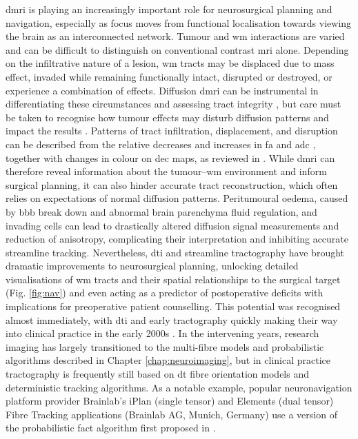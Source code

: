 \documentclass[12pt,phd,a4paper,twoside]{ucl_thesis}
\renewcommand{\textcite}[2][]{
\ifthenelse { \equal {#1} {} }  {\citeauthor{#2}\autocite{#2}}   {\citeauthor{#1}\autocite{#2}}}
\providecommand{\DIFaddtex}[1]{{\protect\color{blue} \sf #1}} %
\providecommand{\DIFdeltex}[1]{{\protect\color{red} \scriptsize #1}} %
\providecommand{\DIFaddbegin}{} %
\providecommand{\DIFaddend}{} %
\providecommand{\DIFdelbegin}{} %
\providecommand{\DIFdelend}{} %
\providecommand{\DIFadd}[1]{\texorpdfstring{\DIFaddtex{#1}}{#1}} %
\providecommand{\DIFdel}[1]{\texorpdfstring{\DIFdeltex{#1}}{}} %
\newcommand{\DIFscaledelfig}{0.5}
\newlength{\DIFdelgraphicswidth} %
\newlength{\DIFdelgraphicsheight} %
\newcommand{\DIFaddincludegraphics}[2][]{{\color{blue}\fbox{\DIFOincludegraphics[#1]{#2}}}} %
\newcommand{\DIFdelincludegraphics}[2][]{%
\sbox{\DIFdelgraphicsbox}{\DIFOincludegraphics[#1]{#2}}%
\settoboxwidth{\DIFdelgraphicswidth}{\DIFdelgraphicsbox} %
\settoboxtotalheight{\DIFdelgraphicsheight}{\DIFdelgraphicsbox} %
\scalebox{\DIFscaledelfig}{%
\parbox[b]{\DIFdelgraphicswidth}{\usebox{\DIFdelgraphicsbox}\\[-\baselineskip] \rule{\DIFdelgraphicswidth}{0em}}\llap{\resizebox{\DIFdelgraphicswidth}{\DIFdelgraphicsheight}{%
\setlength{\unitlength}{\DIFdelgraphicswidth}%
\begin{picture}(1,1)%
\thicklines\linethickness{2pt} %
{\color[rgb]{1,0,0}\put(0,0){\framebox(1,1){}}}%
{\color[rgb]{1,0,0}\put(0,0){\line( 1,1){1}}}%
{\color[rgb]{1,0,0}\put(0,1){\line(1,-1){1}}}%
\end{picture}%
}\hspace*{3pt}}} %
} %
\DeclareRobustCommand{\DIFaddbegin}{\DIFOaddbegin \let\includegraphics\DIFaddincludegraphics} %
\DeclareRobustCommand{\DIFaddend}{\DIFOaddend \let\includegraphics\DIFOincludegraphics} %
\DeclareRobustCommand{\DIFdelbegin}{\DIFOdelbegin \let\includegraphics\DIFdelincludegraphics} %
\DeclareRobustCommand{\DIFdelend}{\DIFOaddend \let\includegraphics\DIFOincludegraphics} %
\begin{document}
\Gls{dmri} is playing an increasingly important role for neurosurgical planning and navigation\autocite{Manan2022}, especially as focus moves from functional localisation towards viewing the brain as an interconnected network.
Tumour and \gls{wm} interactions are varied and can be difficult to distinguish on conventional contrast \gls{mri} alone.
Depending on the infiltrative nature of a lesion, \gls{wm} tracts may be displaced due to mass effect, invaded while remaining functionally intact, disrupted or destroyed, or experience a combination of effects\autocite{Essayed2017,DSouza2019,Manan2023}.
Diffusion \gls{dmri} can be instrumental in differentiating these circumstances and assessing tract integrity\autocite{Field2004,Manan2023}\DIFdelbegin \DIFdel{, but care must be taken to recognise how tumour effects may disturb diffusion patterns and impact the results}\DIFdelend \DIFaddbegin \DIFadd{.
Patterns of tract infiltration, displacement, and disruption can be described from the relative decreases and increases in }\gls{fa} \DIFadd{and }\gls{adc}\DIFadd{, together with changes in colour on }\gls{dec} \DIFadd{maps, as reviewed in \textcite{Manan2023}.
While }\gls{dmri} \DIFadd{can therefore reveal information about the tumour--}\gls{wm} \DIFadd{environment and inform surgical planning, it can also hinder accurate tract reconstruction, which often relies on expectations of normal diffusion patterns}\DIFaddend .
Peritumoural oedema, caused by \gls{bbb} break down and abnormal brain parenchyma fluid regulation\autocite{Ohmura2023}, and invading cells can lead to drastically altered diffusion signal measurements and reduction of anisotropy, complicating their interpretation and inhibiting accurate streamline tracking\autocite{Bulakbas2009,Nimsky2010,Kuhnt2013}.
Nevertheless, \gls{dti} and streamline tractography have brought dramatic improvements to neurosurgical planning, unlocking detailed visualisations of \gls{wm} tracts and their spatial relationships to the surgical target (Fig. \ref{fig:nav}) and even acting as a predictor of postoperative deficits with implications for preoperative patient counselling\autocite{Manan2022}.
This potential was recognised almost immediately, with \gls{dti} and early tractography quickly making their way into clinical practice in the early 2000s \autocite{Lee2001,Mori2002a,Nimsky2005}.
In the intervening years, research imaging has largely transitioned to the multi-fibre models and probabilistic algorithms described in Chapter \ref{chap:neuroimaging}, but in clinical practice tractography is frequently still based on \gls{dt} fibre orientation models \autocite{Toescu2020, Yang2021} and deterministic tracking algorithms.
As a notable example, popular neuronavigation platform provider Brainlab's iPlan\textregistered{} (single tensor)\autocite{Brainlab2012} and Elements (dual tensor)\autocite{Sollmann2020a} Fibre Tracking applications (Brainlab AG, Munich, Germany) use a version of the probabilistic \gls{fact} algorithm first proposed in \citeyear{Mori1999} \autocite{Mori1999}.
\end{document}
